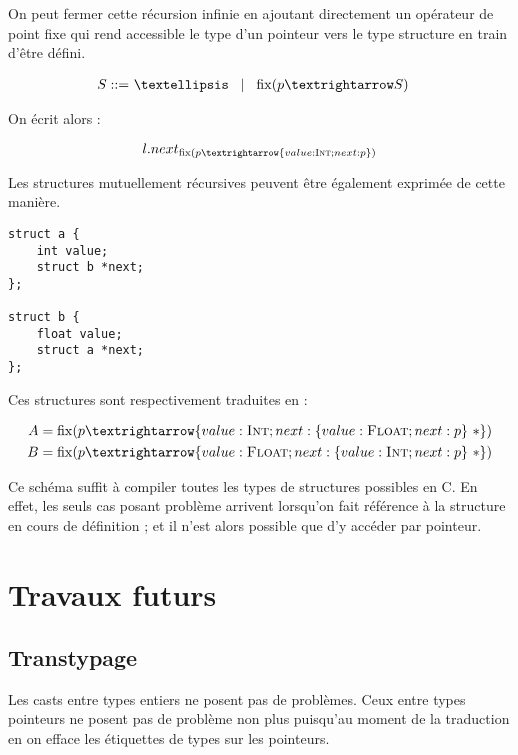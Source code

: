 On peut fermer cette récursion infinie en ajoutant directement un opérateur de
point fixe qui rend accessible le type d'un pointeur vers le type structure en
train d'être défini.

\begin{align*}
    S \gramisa & … \gramorx \mathrm{fix}(p → S)
\end{align*}

On écrit alors :

\[
  l.next_{ \mathrm{fix}(p → \{ value : \tInt ; next : p \}) }
\]

Les structures mutuellement récursives peuvent être également exprimée de cette
manière.

\begin{verbatim}
struct a {
    int value;
    struct b *next;
};

struct b {
    float value;
    struct a *next;
};
\end{verbatim}

Ces structures sont respectivement traduites en :

\begin{align*}
  A &= \mathrm{fix} (p → \{ value : \tInt   ; next : \{ value : \tFloat ; next : p \}~* \}) \\
  B &= \mathrm{fix} (p → \{ value : \tFloat ; next : \{ value : \tInt   ; next : p \}~* \})
\end{align*}

Ce schéma suffit à compiler toutes les types de structures possibles en C. En
effet, les seuls cas posant problème arrivent lorsqu'on fait référence à la
structure en cours de définition ; et il n'est alors possible que d'y accéder
par pointeur.


\section{Travaux futurs}

\subsection{Transtypage}


Les casts entre types entiers ne posent pas de problèmes. Ceux entre types
pointeurs ne posent pas de problème non plus puisqu'au moment de la traduction
en \langname on efface les étiquettes de types sur les pointeurs.

